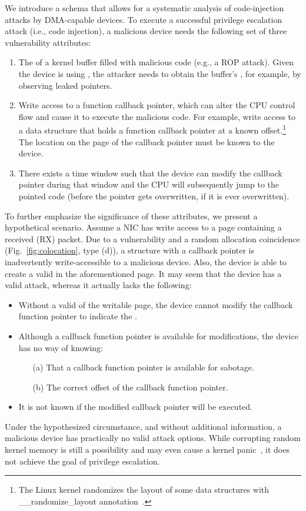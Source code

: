 We introduce a schema that allows for a systematic analysis of code-injection attacks by DMA-capable devices.
To execute a successful privilege escalation attack (i.e., code injection), a malicious device needs the following set of three vulnerability attributes:
\begin{enumerate}
    \item The \kva{} of a kernel buffer filled with malicious code (e.g., a ROP attack). Given the device is using \iova, the attacker needs to obtain the buffer's \kva{}, for example, by observing leaked pointers. 
    \item Write access to a function callback pointer, which can alter the CPU control flow and cause it to execute the malicious code. For example, write access to a data structure that holds a function callback pointer at a known offset.\footnote{The Linux kernel randomizes the layout of some data structures with \_\_randomize\_layout annotation~\cite{rand_layout}.} The location on the page of the callback pointer must be known to the device.
    \item There exists a time window such that the device can modify the callback pointer during that window and the CPU will subsequently jump to the pointed code (before the pointer gets overwritten, if it is ever overwritten).
\end{enumerate}

To further emphasize the significance of these attributes, we present a hypothetical scenario. Assume a NIC has write access to a page containing a received (RX) packet. Due to a \subpage{} vulnerability and a random allocation coincidence (Fig.~\ref{fig:colocation}, type (d)), a structure with a callback pointer is inadvertently write-accessible to a malicious device. Also, the device is able to create a valid \mabaf{} in the aforementioned page. It may seem that the device has a valid attack, whereas it actually lacks the following:

\begin{itemize}
    \item Without a valid \kva{} of the writable page, the device cannot modify the callback function pointer to indicate the \mabaf.
    \item Although a callback function pointer is available for modifications, the device has no way of knowing: 
    \begin{enumerate}
        \item[(a)] That a callback function pointer is available for sabotage.
        \item[(b)] The correct offset of the callback function pointer.
    \end{enumerate}
    \item It is not known if the modified callback pointer will be executed.
\end{itemize}

Under the hypothesized circumstance, and without additional information, a malicious device has practically no valid attack options. 
While corrupting random kernel memory is still a possibility and may even cause a kernel panic~\cite{MMT16}, it does not achieve the goal of privilege escalation.

